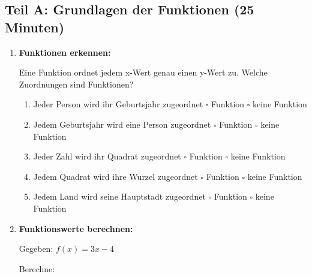 \subsection*{Teil A: Grundlagen der Funktionen (25 Minuten)}

\begin{enumerate}[label=\arabic*.]

    \item \textbf{Funktionen erkennen:}

    Eine Funktion ordnet jedem x-Wert genau einen y-Wert zu. Welche Zuordnungen sind Funktionen?

    \vspace{0.5cm}
    \begin{enumerate}[label=\alph*)]
        \item Jeder Person wird ihr Geburtsjahr zugeordnet \hspace{1cm} $\square$ Funktion \hspace{1cm} $\square$ keine Funktion

        \item Jedem Geburtsjahr wird eine Person zugeordnet \hspace{1cm} $\square$ Funktion \hspace{1cm} $\square$ keine Funktion

        \item Jeder Zahl wird ihr Quadrat zugeordnet \hspace{1cm} $\square$ Funktion \hspace{1cm} $\square$ keine Funktion

        \item Jedem Quadrat wird ihre Wurzel zugeordnet \hspace{1cm} $\square$ Funktion \hspace{1cm} $\square$ keine Funktion

        \item Jedem Land wird seine Hauptstadt zugeordnet \hspace{1cm} $\square$ Funktion \hspace{1cm} $\square$ keine Funktion
    \end{enumerate}

    \vspace{1cm}

    \item \textbf{Funktionswerte berechnen:}

    Gegeben: $f(x) = 3x - 4$

    Berechne: \vspace{0.5cm}


\end{enumerate}
